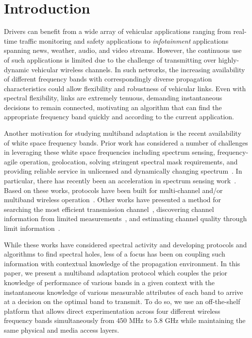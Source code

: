 
\section{Introduction}
\label{sec:introduction}


Drivers can benefit from a wide array of vehicular applications ranging from real-time traffic monitoring and
safety applications to {\it infotainment} applications spanning news, weather, audio, and video streams.  
However, the continuous use of such applications is limited due to the challenge of transmitting over 
highly-dynamic vehicular wireless channels. In such networks, the increasing availability of different 
frequency bands with correspondingly diverse propagation characteristics could allow flexibility and 
robustness of vehicular links. Even with spectral flexibility, links are extremely tenuous, 
demanding instantaneous decisions to remain connected, motivating an algorithm that
can find the appropriate frequency band quickly and according to the current application.

Another motivation for studying multiband adaptation is the recent availability of white space frequency bands. Prior work has considered a number of challenges in
leveraging these white space frequencies including spectrum sensing, frequency-agile operation,
geolocation, solving stringent spectral mask requirements, and providing reliable service
in unlicensed and dynamically changing spectrum~\cite{shellhammer2009technical}. In particular, there has recently been an acceleration
in spectrum sensing work~\cite{rayanchu2011fluid, kim1996pulse,cabric2004implementation}. Based on 
these works, protocols have been built for multi-channel and/or multiband wireless operation~\cite{MOAR,
raychaudhuri2003spectrum,sabharwal2007opportunistic}.  Other works have presented a method for searching the most efficient 
transmission channel~\cite{mo2005comparison}, discovering channel information from limited 
measurements~\cite{rayanchu2011fluid, sabharwal2007opportunistic}, and estimating 
channel quality through limit information~\cite{MOAR}. 

While these works have considered spectral activity and developing protocols and algorithms to 
find spectral holes, less of a focus has been on coupling such information with contextual knowledge of the 
propagation environment.
In this paper, 
we present a multiband adaptation protocol which couples the prior knowledge of performance of various bands in a given context with the instantaneous knowledge of various measurable attributes of each band to arrive at a decision on the optimal band to transmit. To do so, we use an
off-the-shelf platform that allows direct experimentation across four different wireless
frequency bands simultaneously from 450 MHz to 5.8 GHz while maintaining the same physical
and media access layers. 

